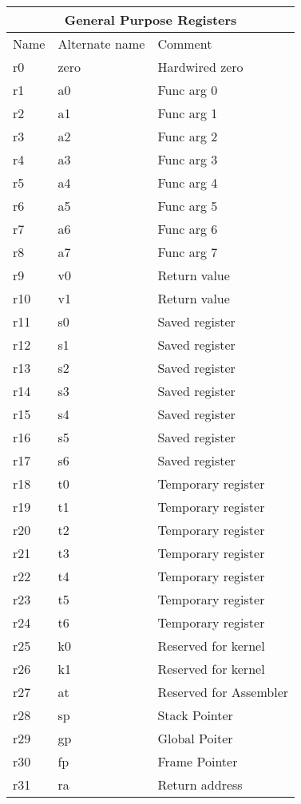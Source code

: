 \begin{tabular}{ |p{3cm}|p{3cm}|p{4cm}|  }
    \hline
    \multicolumn{3}{|c|}{General Purpose Registers} \\
    \hline
    Name& Alternate name & Comment \\
    \hline
    r0  & zero & Hardwired zero\\
    r1  & a0   & Func arg 0 \\
    r2  & a1   & Func arg 1 \\
    r3  & a2   & Func arg 2 \\
    r4  & a3   & Func arg 3 \\
    r5  & a4   & Func arg 4 \\
    r6  & a5   & Func arg 5 \\
    r7  & a6   & Func arg 6 \\
    r8  & a7   & Func arg 7 \\
    r9  & v0   & Return value \\
    r10 & v1   & Return value \\
    r11 & s0   & Saved register \\
    r12 & s1   & Saved register  \\
    r13 & s2   & Saved register  \\
    r14 & s3   & Saved register  \\
    r15 & s4   & Saved register  \\
    r16 & s5   & Saved register  \\
    r17 & s6   & Saved register  \\
    r18 & t0   & Temporary register \\
    r19 & t1   & Temporary register \\
    r20 & t2   & Temporary register \\
    r21 & t3   & Temporary register \\
    r22 & t4   & Temporary register \\
    r23 & t5   & Temporary register \\
    r24 & t6   & Temporary register\\
    r25 & k0   & Reserved for kernel \\
    r26 & k1   & Reserved for kernel \\
    r27 & at   & Reserved for Assembler \\
    r28 & sp   & Stack Pointer \\
    r29 & gp   & Global Poiter \\
    r30 & fp   & Frame Pointer \\
    r31 & ra   & Return address \\
    
    \hline
\end{tabular}

